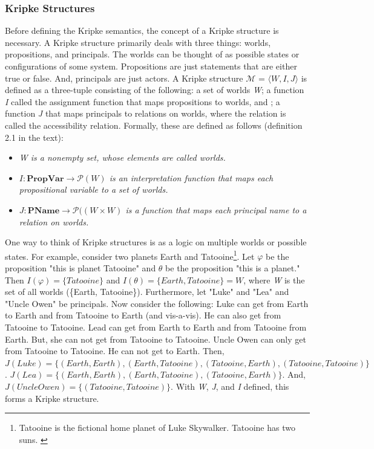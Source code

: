 \documentclass[../../main/main.tex]{subfiles}
\begin{document}
\subsubsection{Kripke Structures}
Before defining the Kripke semantics, the concept of a Kripke structure is necessary.  A Kripke structure primarily deals with three things: worlds, propositions, and principals.  The worlds can be thought of as possible states or configurations of some system.  Propositions are just statements that are either true or false.  And, principals are just actors.  A Kripke structure $\mathcal{M}$ = $\langle \textit{W}, \textit{I}, \textit{J} \rangle $  is defined as a three-tuple consisting of the following: a set of worlds \textit{W}; a function \textit{I} called the assignment function that maps propositions to worlds, and ; a function \textit{J} that maps principals to relations on worlds, where the relation is called the accessibility relation.  Formally, these are defined as follows (definition 2.1 in the text): 

\begin{itemize}
\item \textit{W is a nonempty set, whose elements are called worlds.}
\item \textit{$I: \mathbf{PropVar} \rightarrow \mathcal{P}(W)$ is an interpretation function that maps each propositional variable to a set of worlds.}
\item \textit{$J: \mathbf{PName} \rightarrow \mathcal{P}((W \times W)$ is a function that maps each principal name to a relation on worlds.}
\end{itemize}

One way to think of Kripke structures is as a logic on multiple worlds or possible states.  For example, consider two planets Earth and Tatooine\footnote{Tatooine is the fictional home planet of Luke Skywalker.  Tatooine has two suns.  \cite{Tantooine}}.  Let $\varphi$ be the proposition "this is planet Tatooine" and $\theta$ be the proposition "this is a planet."  Then $I(\varphi) = \{Tatooine\}$ and $I(\theta) = \{Earth, Tatooine\} = W$, where \textit{W} is the set of all worlds (\{Earth, Tatooine\}).  Furthermore, let "Luke" and "Lea" and "Uncle Owen" be principals.  Now consider the following:  Luke can get from Earth to Earth and from Tatooine to Earth (and vis-a-vis).  He can also get from Tatooine to Tatooine.  Lead can get from Earth to Earth and from Tatooine from Earth.  But, she can not get from Tatooine to Tatooine.  Uncle Owen can only get from Tatooine to Tatooine.  He can not get to Earth.  Then, $J(Luke) = \{(Earth, Earth),(Earth, Tatooine),(Tatooine, Earth), (Tatooine, Tatooine)\}$.  $J(Lea) = \{(Earth, Earth),(Earth, Tatooine),(Tatooine, Earth)\}$. And, $J(Uncle Owen) = \{(Tatooine, Tatooine)\}$. With \textit{W}, \textit{J}, and \textit{I} defined, this forms a Kripke structure.
\end{document}
